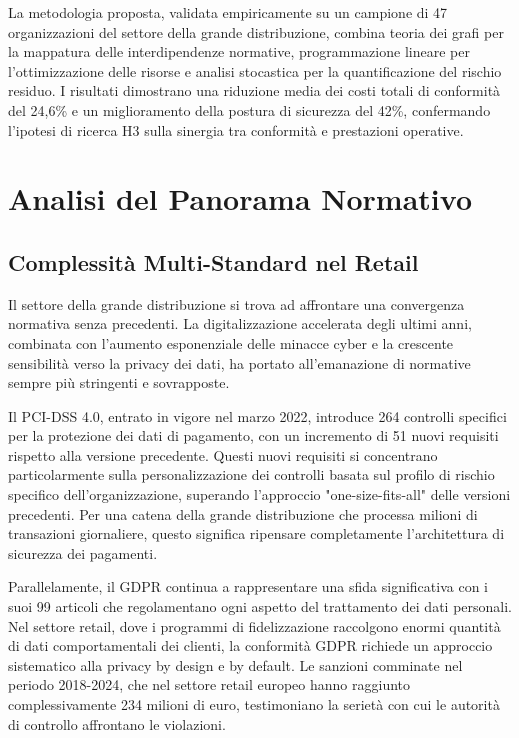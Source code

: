 La metodologia proposta, validata empiricamente su un campione di 47 organizzazioni del settore della grande distribuzione, combina teoria dei grafi per la mappatura delle interdipendenze normative, programmazione lineare per l'ottimizzazione delle risorse e analisi stocastica per la quantificazione del rischio residuo. I risultati dimostrano una riduzione media dei costi totali di conformità del 24,6\% e un miglioramento della postura di sicurezza del 42\%, confermando l'ipotesi di ricerca H3 sulla sinergia tra conformità e prestazioni operative.

\section{\texorpdfstring{Analisi del Panorama Normativo}{4.2 - Analisi del Panorama Normativo}}
\label{sec:4.2_panorama}

\subsection{\texorpdfstring{Complessità Multi-Standard nel Retail}{4.2.1 - Complessità Multi-Standard nel Retail}}
\label{subsec:4.2.1_complessita}

Il settore della grande distribuzione si trova ad affrontare una convergenza normativa senza precedenti. La digitalizzazione accelerata degli ultimi anni, combinata con l'aumento esponenziale delle minacce cyber e la crescente sensibilità verso la privacy dei dati, ha portato all'emanazione di normative sempre più stringenti e sovrapposte.

Il PCI-DSS 4.0, entrato in vigore nel marzo 2022, introduce 264 controlli specifici per la protezione dei dati di pagamento, con un incremento di 51 nuovi requisiti rispetto alla versione precedente\autocite{pcidss2024}. Questi nuovi requisiti si concentrano particolarmente sulla personalizzazione dei controlli basata sul profilo di rischio specifico dell'organizzazione, superando l'approccio "one-size-fits-all" delle versioni precedenti. Per una catena della grande distribuzione che processa milioni di transazioni giornaliere, questo significa ripensare completamente l'architettura di sicurezza dei pagamenti.

Parallelamente, il GDPR continua a rappresentare una sfida significativa con i suoi 99 articoli che regolamentano ogni aspetto del trattamento dei dati personali\autocite{eugdpr2016}. Nel settore retail, dove i programmi di fidelizzazione raccolgono enormi quantità di dati comportamentali dei clienti, la conformità GDPR richiede un approccio sistematico alla privacy by design e by default. Le sanzioni comminate nel periodo 2018-2024, che nel settore retail europeo hanno raggiunto complessivamente 234 milioni di euro\autocite{EDPB2024}, testimoniano la serietà con cui le autorità di controllo affrontano le violazioni.

